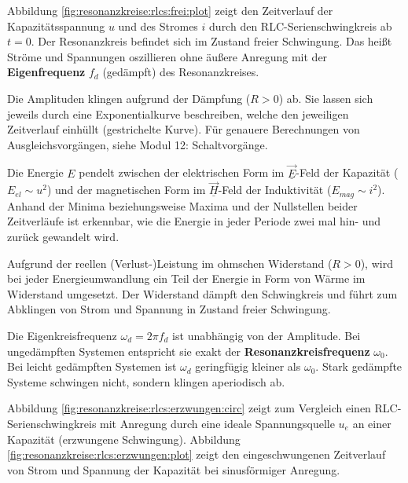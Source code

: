 \begin{frame}
{    Abbildung \ref{fig:resonanzkreise:rlcs:frei:plot} zeigt den Zeitverlauf der Kapazitätsspannung $u$
    und des Stromes $i$ durch den RLC-Serienschwingkreis ab $t=0$. %
    Der Resonanzkreis befindet sich im Zustand freier Schwingung. 
    Das heißt Ströme und Spannungen oszillieren ohne äußere Anregung mit der \textbf{Eigenfrequenz} $f_d$ 
    (gedämpft) des Resonanzkreises.

    Die Amplituden klingen aufgrund der Dämpfung ($R>0$) ab. 
    Sie lassen sich jeweils durch eine Exponentialkurve beschreiben, 
    welche den jeweiligen Zeitverlauf einhüllt (gestrichelte Kurve).
    Für genauere Berechnungen von Ausgleichsvorgängen, siehe Modul 12: Schaltvorgänge.%

    Die Energie $E$ pendelt zwischen 
    der elektrischen Form im $\vec{\underline{E}}$-Feld der Kapazität ($E_{el} \sim u^2$) und 
    der magnetischen Form im $\vec{\underline{H}}$-Feld der Induktivität ($E_{mag} \sim i^2$). 
    Anhand der Minima beziehungsweise Maxima und der Nullstellen beider Zeitverläufe ist erkennbar, 
    wie die Energie in jeder Periode zwei mal hin- und zurück gewandelt wird. 

    Aufgrund der reellen (Verlust-)Leistung im ohmschen Widerstand ($R > 0$), 
    wird bei jeder Energieumwandlung ein Teil der Energie in Form von Wärme im Widerstand umgesetzt.
    Der Widerstand dämpft den Schwingkreis und führt zum Abklingen von Strom und Spannung in Zustand freier Schwingung.

    Die Eigenkreisfrequenz $\omega_d = 2\pi f_d$ ist unabhängig von der Amplitude.
    Bei ungedämpften Systemen entspricht sie exakt der \textbf{Resonanzkreisfrequenz} $\omega_0$.
    Bei leicht gedämpften Systemen ist $\omega_d$ geringfügig kleiner als $\omega_0$.
    Stark gedämpfte Systeme schwingen nicht, sondern klingen aperiodisch ab.

    Abbildung \ref{fig:resonanzkreise:rlcs:erzwungen:circ} zeigt zum Vergleich einen RLC-Serienschwingkreis
    mit Anregung durch eine ideale Spannungsquelle $u_e$ an einer Kapazität (erzwungene Schwingung). 
    Abbildung \ref{fig:resonanzkreise:rlcs:erzwungen:plot} zeigt den eingeschwungenen Zeitverlauf 
    von Strom und Spannung der Kapazität bei sinusförmiger Anregung. 

}
\end{frame}
